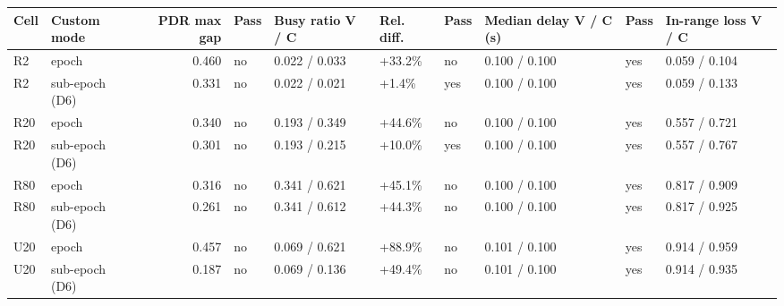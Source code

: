 \begin{tabular}{llrlllllll}
\hline
Cell & Custom mode & PDR max gap & Pass & Busy ratio V / C & Rel. diff. & Pass & Median delay V / C (s) & Pass & In-range loss V / C \\
\hline
R2 & epoch & 0.460 & no & 0.022 / 0.033 & +33.2\% & no & 0.100 / 0.100 & yes & 0.059 / 0.104 \\
R2 & sub-epoch (D6) & 0.331 & no & 0.022 / 0.021 & +1.4\% & yes & 0.100 / 0.100 & yes & 0.059 / 0.133 \\
R20 & epoch & 0.340 & no & 0.193 / 0.349 & +44.6\% & no & 0.100 / 0.100 & yes & 0.557 / 0.721 \\
R20 & sub-epoch (D6) & 0.301 & no & 0.193 / 0.215 & +10.0\% & yes & 0.100 / 0.100 & yes & 0.557 / 0.767 \\
R80 & epoch & 0.316 & no & 0.341 / 0.621 & +45.1\% & no & 0.100 / 0.100 & yes & 0.817 / 0.909 \\
R80 & sub-epoch (D6) & 0.261 & no & 0.341 / 0.612 & +44.3\% & no & 0.100 / 0.100 & yes & 0.817 / 0.925 \\
U20 & epoch & 0.457 & no & 0.069 / 0.621 & +88.9\% & no & 0.101 / 0.100 & yes & 0.914 / 0.959 \\
U20 & sub-epoch (D6) & 0.187 & no & 0.069 / 0.136 & +49.4\% & no & 0.101 / 0.100 & yes & 0.914 / 0.935 \\
\hline
\end{tabular}
